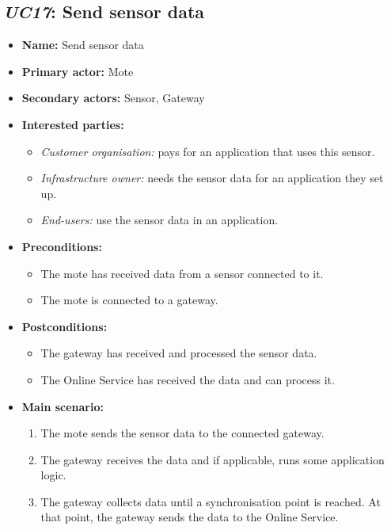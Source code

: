 \subsection{\emph{UC17}: Send sensor data}
\begin{itemize}
    \item \textbf{Name:} Send sensor data
    \item \textbf{Primary actor:} Mote
    \item \textbf{Secondary actors:} Sensor, Gateway
    \item \textbf{Interested parties:}
        \begin{itemize}
            \item \textit{Customer organisation:} pays for an application that uses this sensor.
            \item \textit{Infrastructure owner:} needs the sensor data for an application they set up.
            \item \textit{End-users:} use the sensor data in an application.
        \end{itemize}

    \item \textbf{Preconditions:}
        \begin{itemize}
            \item The mote has received data from a sensor connected to it.
            \item The mote is connected to a gateway.
        \end{itemize}

    \item \textbf{Postconditions:}
        \begin{itemize}
            \item The gateway has received and processed the sensor data.
            \item The Online Service has received the data and can process it.
        \end{itemize}

    \item \textbf{Main scenario:}
        \begin{enumerate}
           \item The mote sends the sensor data to the connected gateway.
           \item The gateway receives the data and if applicable, runs some application logic.
           \item The gateway collects data until a synchronisation point is reached.
                 At that point, the gateway sends the data to the Online Service.
        \end{enumerate}


\end{itemize}
